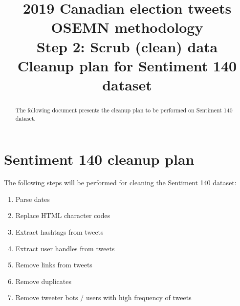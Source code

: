 \documentclass[11pt]{article}
\begin{document}
    \title{2019 Canadian election tweets \\
    OSEMN methodology \\
    Step 2: Scrub (clean) data \\
    Cleanup plan for Sentiment 140 dataset}

    \maketitle

    \begin{abstract}
        The following document presents the cleanup plan to be performed on Sentiment 140 dataset.
    \end{abstract}

    \section{Sentiment 140 cleanup plan} \label{sec:data_prep}

    The following steps will be performed for cleaning the Sentiment 140 dataset:

    \begin{enumerate}
        \item Parse dates
        \item Replace HTML character codes
        \item Extract hashtags from tweets
        \item Extract user handles from tweets
        \item Remove links from tweets
        \item Remove duplicates
        \item Remove tweeter bots / users with high frequency of tweets
    \end{enumerate}
\end{document}
